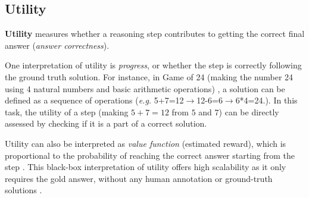 \subsection{Utility}
\label{sec:utility}

\textbf{Utility} measures whether a reasoning step contributes to getting the correct final answer (\textit{answer correctness}).

One interpretation of utility is \textit{progress}, or whether the step is correctly following the ground truth solution. For instance, in Game of 24 (making the number 24 using 4 natural numbers and basic arithmetic operations) \citep{NEURIPS2023_271db992}, a solution can be defined as a sequence of operations (\textit{e.g.} 5+7=12$\rightarrow$12-6=6$\rightarrow$6*4=24.). In this task, the utility of a step (making $5+7=12$ from $5$ and $7$) can be directly assessed by checking if it is a part of a correct solution.

Utility can also be interpreted as \textit{value function} (estimated reward), which is proportional to the probability of reaching the correct answer starting from the step \citep{hao-etal-2023-reasoning, wang-etal-2024-math, xie2024montecarlotreesearch, chen-etal-2023-rev}. This black-box interpretation of utility offers high scalability as it only requires the gold answer, without any human annotation or ground-truth solutions \citep{wang-etal-2024-math, lai2024stepdpostepwisepreferenceoptimization}.
